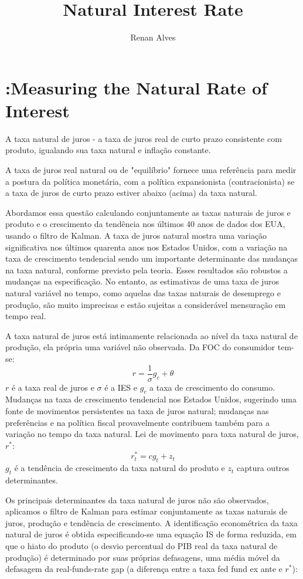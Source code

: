 \documentclass[11pt,oneside,a4paper]{article}
\title{Natural Interest Rate}
\author{Renan Alves}
\begin{document}
\onehalfspacing
\maketitle
\section{\citet{LW:2003}:Measuring the Natural Rate of Interest }
A taxa natural de juros - a taxa de juros real de curto prazo consistente com produto, igualando sua taxa natural e inflação constante.

A taxa de juros real natural ou de "equilíbrio" fornece uma referência para medir a postura da política monetária, com a política expansionista (contracionista) se a taxa de juros de curto prazo estiver abaixo (acima) da taxa natural.

Abordamos essa questão calculando conjuntamente as taxas naturais de juros e produto e o crescimento da tendência nos últimos 40 anos de dados dos EUA, usando o filtro de Kalman. A taxa de juros natural mostra uma variação significativa nos últimos quarenta anos nos Estados Unidos, com a variação na taxa de crescimento tendencial sendo um importante determinante das mudanças na taxa natural, conforme previsto pela teoria. Esses resultados são robustos a mudanças na especificação. No entanto, as estimativas de uma taxa de juros natural variável no tempo, como aquelas das taxas naturais de desemprego e produção, são muito imprecisas e estão sujeitas a considerável mensuração em tempo real.

A taxa natural de juros está intimamente relacionada ao nível da taxa natural de produção, ela própria uma variável não observada. Da FOC do consumidor tem-se: 
\begin{equation}
    r = \dfrac{1}{\sigma} g_c + \theta
\end{equation}
$r$ é a taxa real de juros e $\sigma$ é a IES e $g_c$ a taxa de crescimento do consumo. Mudanças na taxa de crescimento tendencial nos Estados Unidos, sugerindo uma fonte de movimentos persistentes na taxa de juros natural; mudanças nas preferências e na política fiscal provavelmente contribuem também para a variação no tempo da taxa natural. Lei de movimento para taxa natural de juros, $r^{*}$:
\begin{equation}
    r_t^{*} = cg_t + z_t
\end{equation}
$g_t$ é a tendência de crescimento da taxa natural do produto e $z_t$ captura outros determinantes.

Os principais determinantes da taxa natural de juros não são observados, aplicamos o filtro de Kalman para estimar conjuntamente as taxas naturais de juros, produção e tendência de crescimento. A identificação econométrica da taxa natural de juros é obtida especificando-se uma equação IS de forma reduzida, em que o hiato do produto (o desvio percentual do PIB real da taxa natural de produção) é determinado por suas próprias defasagens, uma média móvel da defasagem da real-funds-rate gap (a diferença entre a taxa fed fund ex ante e $r^{*}$):
\end{document}
